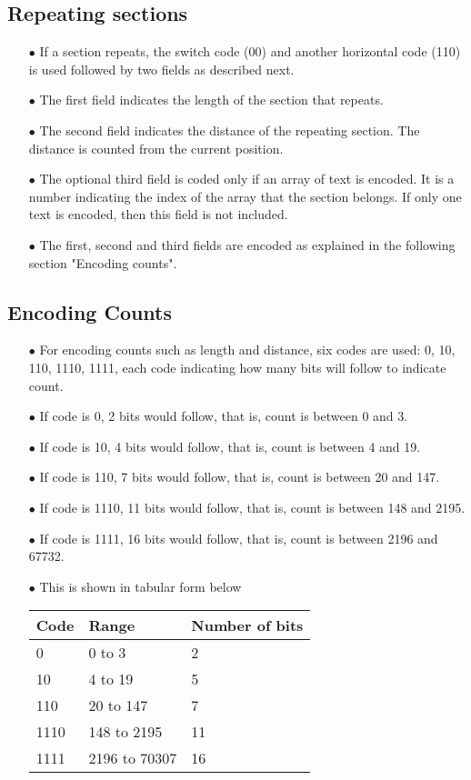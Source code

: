\documentclass[]{article}
\begin{document}
\subsection{Repeating sections}
\begin{itemize}
	\item[$\bullet$] If a section repeats, the switch code (00) and another horizontal code (110) is used followed by two fields as described next.
  	\item[$\bullet$] The first field indicates the length of the section that repeats.
	\item[$\bullet$] The second field indicates the distance of the repeating section. The distance is counted from the current position.
	\item[$\bullet$] The optional third field is coded only if an array of text is encoded. It is a number indicating the index of the array that the section belongs. If only one text is encoded, then this field is not included. 
	\item[$\bullet$] The first, second and third fields are encoded as explained in the following section "Encoding counts".
\end{itemize}

\subsection{Encoding Counts}
\begin{itemize}
	\item[$\bullet$] For encoding counts such as length and distance, six codes are used: 0, 10, 110, 1110, 1111, each code indicating how many bits will follow to indicate count.
	\item[$\bullet$] If code is 0, 2 bits would follow, that is, count is between 0 and 3.
	\item[$\bullet$] If code is 10, 4 bits would follow, that is, count is between 4 and 19.
	\item[$\bullet$] If code is 110, 7 bits would follow, that is, count is between 20 and 147.
	\item[$\bullet$] If code is 1110, 11 bits would follow, that is, count is between 148 and 2195.
	\item[$\bullet$] If code is 1111, 16 bits would follow, that is, count is between 2196 and 67732.
	\item[$\bullet$] This is shown in tabular form below
	\item[] \begin{tabular}{ | l | l | l |} \hline
	\textbf{Code} & \textbf{Range} & \textbf{Number of bits} \\ \hline
	0 & 0 to 3 & 2 \\ \hline
	10 & 4 to 19 & 5 \\ \hline
	110 & 20 to 147 & 7 \\ \hline
	1110 & 148 to 2195 & 11 \\ \hline
	1111 & 2196 to 70307 & 16 \\ \hline
\end{tabular}
\end{itemize}
\end{document}
